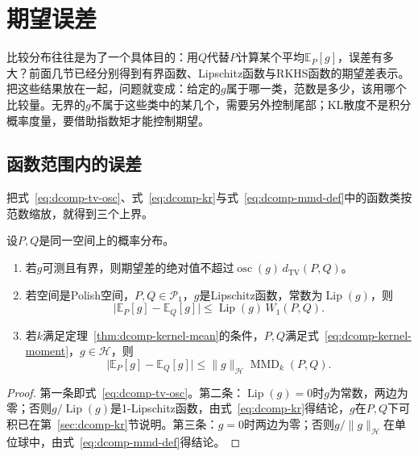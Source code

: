 \section{期望误差}
\label{sec:dcomp-expectation}

比较分布往往是为了一个具体目的：用$Q$代替$P$计算某个平均$\mathbb{E}_{P}[g]$，误差有多大？前面几节已经分别得到有界函数、Lipschitz函数与RKHS函数的期望差表示。把这些结果放在一起，问题就变成：给定的$g$属于哪一类，范数是多少，该用哪个比较量。无界的$g$不属于这些类中的某几个，需要另外控制尾部；KL散度不是积分概率度量，要借助指数矩才能控制期望。

\subsection{函数范围内的误差}
\label{sec:dcomp-function-bounds}

把式~\eqref{eq:dcomp-tv-osc}、式~\eqref{eq:dcomp-kr}与式~\eqref{eq:dcomp-mmd-def}中的函数类按范数缩放，就得到三个上界。

\begin{theorem}[三类函数的期望差]
\label{thm:dcomp-three-bounds}
设$P,Q$是同一空间上的概率分布。
\begin{enumerate}
 \item 若$g$可测且有界，则期望差的绝对值不超过$\operatorname{osc}(g)\,d_{\mathrm{TV}}(P,Q)$。
 \item 若空间是Polish空间，$P,Q\in\mathcal{P}_1$，$g$是Lipschitz函数，常数为$\operatorname{Lip}(g)$，则
 \begin{equation}
  \bigl\lvert\mathbb{E}_{P}[g]-\mathbb{E}_{Q}[g]\bigr\rvert\leq\operatorname{Lip}(g)\,W_1(P,Q) .
  \label{eq:dcomp-lip-bound}
 \end{equation}
 \item 若$k$满足定理~\ref{thm:dcomp-kernel-mean}的条件，$P,Q$满足式~\eqref{eq:dcomp-kernel-moment}，$g\in\mathcal{H}$，则
 \begin{equation}
  \bigl\lvert\mathbb{E}_{P}[g]-\mathbb{E}_{Q}[g]\bigr\rvert\leq\lVert g\rVert_{\mathcal{H}}\operatorname{MMD}_k(P,Q) .
  \label{eq:dcomp-rkhs-bound}
 \end{equation}
\end{enumerate}
\end{theorem}

\begin{proof}
第一条即式~\eqref{eq:dcomp-tv-osc}。第二条：$\operatorname{Lip}(g)=0$时$g$为常数，两边为零；否则$g/\operatorname{Lip}(g)$是1-Lipschitz函数，由式~\eqref{eq:dcomp-kr}得结论，$g$在$P,Q$下可积已在第~\ref{sec:dcomp-kr}节说明。第三条：$g=0$时两边为零；否则$g/\lVert g\rVert_{\mathcal{H}}$在单位球中，由式~\eqref{eq:dcomp-mmd-def}得结论。
\end{proof}

